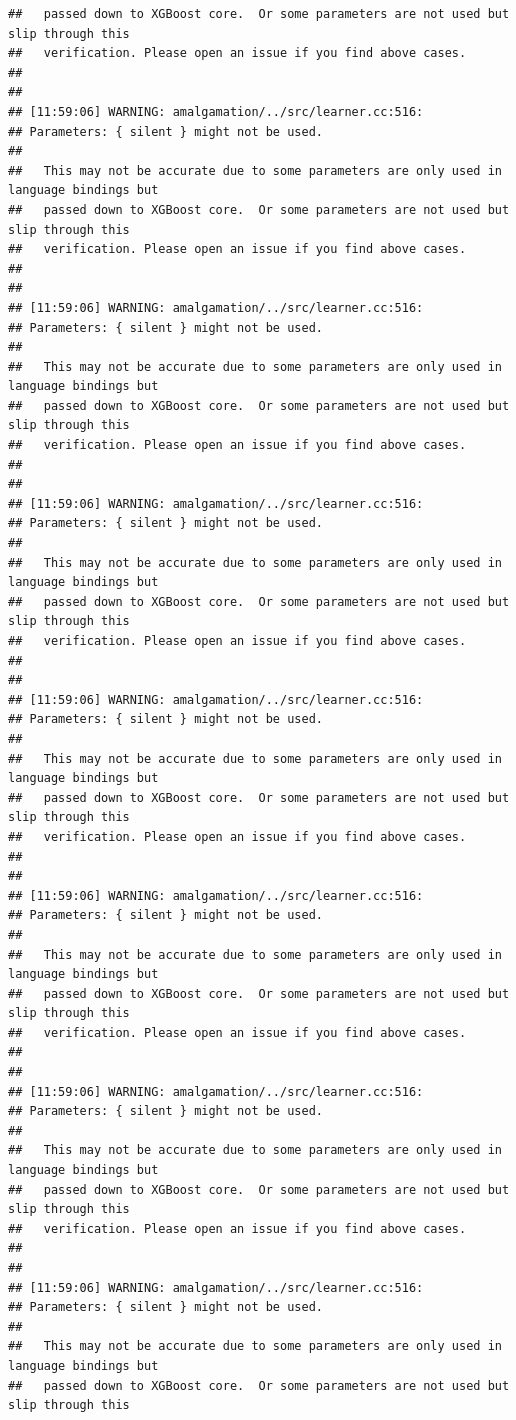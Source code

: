 \documentclass[AMS,STIX2COL]{WileyNJD-v2}\usepackage[]{graphicx}\usepackage[]{color}
\makeatletter
\newenvironment{kframe}{%
 \def\at@end@of@kframe{}%
 \ifinner\ifhmode%
  \def\at@end@of@kframe{\end{minipage}}%
  \begin{minipage}{\columnwidth}%
 \fi\fi%
 \def\FrameCommand##1{\hskip\@totalleftmargin \hskip-\fboxsep
 \colorbox{shadecolor}{##1}\hskip-\fboxsep
     \hskip-\linewidth \hskip-\@totalleftmargin \hskip\columnwidth}%
 \MakeFramed {\advance\hsize-\width
   \@totalleftmargin\z@ \linewidth\hsize
   \@setminipage}}%
 {\par\unskip\endMakeFramed%
 \at@end@of@kframe}
\newenvironment{knitrout}{}{} %
\makeatother
\begin{document}
\begin{knitrout}
\begin{kframe}
\begin{verbatim}
##   passed down to XGBoost core.  Or some parameters are not used but slip through this
##   verification. Please open an issue if you find above cases.
## 
## 
## [11:59:06] WARNING: amalgamation/../src/learner.cc:516: 
## Parameters: { silent } might not be used.
## 
##   This may not be accurate due to some parameters are only used in language bindings but
##   passed down to XGBoost core.  Or some parameters are not used but slip through this
##   verification. Please open an issue if you find above cases.
## 
## 
## [11:59:06] WARNING: amalgamation/../src/learner.cc:516: 
## Parameters: { silent } might not be used.
## 
##   This may not be accurate due to some parameters are only used in language bindings but
##   passed down to XGBoost core.  Or some parameters are not used but slip through this
##   verification. Please open an issue if you find above cases.
## 
## 
## [11:59:06] WARNING: amalgamation/../src/learner.cc:516: 
## Parameters: { silent } might not be used.
## 
##   This may not be accurate due to some parameters are only used in language bindings but
##   passed down to XGBoost core.  Or some parameters are not used but slip through this
##   verification. Please open an issue if you find above cases.
## 
## 
## [11:59:06] WARNING: amalgamation/../src/learner.cc:516: 
## Parameters: { silent } might not be used.
## 
##   This may not be accurate due to some parameters are only used in language bindings but
##   passed down to XGBoost core.  Or some parameters are not used but slip through this
##   verification. Please open an issue if you find above cases.
## 
## 
## [11:59:06] WARNING: amalgamation/../src/learner.cc:516: 
## Parameters: { silent } might not be used.
## 
##   This may not be accurate due to some parameters are only used in language bindings but
##   passed down to XGBoost core.  Or some parameters are not used but slip through this
##   verification. Please open an issue if you find above cases.
## 
## 
## [11:59:06] WARNING: amalgamation/../src/learner.cc:516: 
## Parameters: { silent } might not be used.
## 
##   This may not be accurate due to some parameters are only used in language bindings but
##   passed down to XGBoost core.  Or some parameters are not used but slip through this
##   verification. Please open an issue if you find above cases.
## 
## 
## [11:59:06] WARNING: amalgamation/../src/learner.cc:516: 
## Parameters: { silent } might not be used.
## 
##   This may not be accurate due to some parameters are only used in language bindings but
##   passed down to XGBoost core.  Or some parameters are not used but slip through this

\end{verbatim}
\end{kframe}
\end{knitrout}
\end{document}
